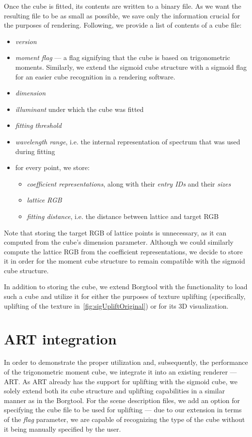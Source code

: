 Once the cube is fitted, its contents are written to a binary file. As we want the resulting file to be as small as possible, we save only the information crucial for the purposes of rendering. Following, we provide a list of contents of a cube file:
\begin{itemize}
	\item \emph{version}
	\item \emph{moment flag} --- a flag signifying that the cube is based on trigonometric moments. Similarly, we extend the sigmoid cube structure with a sigmoid flag for an easier cube recognition in a rendering software.
	\item \emph{dimension}
	\item \emph{illuminant} under which the cube was fitted
	\item \emph{fitting threshold}
	\item \emph{wavelength range}, i.e. the internal representation of spectrum that was used during fitting
	\item for every point, we store:
	\begin{itemize}
		\item \emph{coefficient representations}, along with their \emph{entry IDs} and their \emph{sizes}
		\item \emph{lattice RGB}
		\item \emph{fitting distance}, i.e. the distance between lattice and target RGB
	\end{itemize}
\end{itemize}

Note that storing the target RGB of lattice points is unnecessary, as it can computed from the cube's dimension parameter. Although we could similarly compute the lattice RGB from the coefficient representations, we decide to store it in order for the moment cube structure to remain compatible with the sigmoid cube structure.

In addition to storing the cube, we extend Borgtool with the functionality to load such a cube and utilize it for either the purposes of texture uplifting (specifically, uplifting of the texture in~\cref{fig:sigUpliftOriginal}) or for its 3D visualization.

\section{ART integration}

In order to demonstrate the proper utilization and, subsequently, the performance of the trigonometric moment cube, we integrate it into an existing renderer --- ART. As ART already has the support for uplifting with the sigmoid cube, we solely extend both its cube structure and uplifting capabilities in a similar manner as in the Borgtool. For the scene description files, we add an option for specifying the cube file to be used for uplifting --- due to our extension in terms of the \emph{flag} parameter, we are capable of recognizing the type of the cube without it being manually specified by the user.

